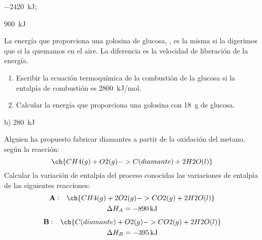 \documentclass[10pt,a5paper,twoside]{article}
\begin{document}
  \begin{solution}
    \begin{enumerate*}
      \item \SI{-2420}{\kilo\joule}; \item \SI{900}{\kilo\joule}
    \end{enumerate*}
  \end{solution}









  \begin{exercise}[
      tags    = {termodinámica, entalpía, entalpia de reacción, calor},
      topics  = {química, termoquímica, termodinámica},
      source  = {},
    ]
    La energía que proporciona una golosina de glucosa, , es la misma si la digerimos que si la quemamos en el aire. La diferencia es la velocidad de liberación de la energía.
    \begin{enumerate}
      \item Escribir la ecuación termoquímica de la combustión de la glucosa si la entalpía de combustión es \SI{2800}{kJ/mol}.
      \item Calcular la energía que proporciona una golosina con \SI{18}{\gram} de glucosa.
    \end{enumerate}
  \end{exercise}

  \begin{solution}
    b) \SI{280}{\kilo\joule}
  \end{solution}




  \begin{exercise}[
      tags    = {termodinámica, entalpía, ley de Hess},
      topics  = {química, termoquímica, termodinámica},
      source  = {},
    ]
    Alguien ha propuesto fabricar diamantes a partir de la oxidación del metano, según la reacción:
    \[ \ch{CH4(g) + O2(g) -> C(diamante) + 2 H2O(l)}  \]
    Calcular la variación de entalpía del proceso conocidas las variaciones de entalpía de las siguientes reacciones:
    \begin{multline*}
      \mathbf{A:}\quad\ch{CH4(g) + 2 O2(g) -> CO2(g) + 2 H2O(l)} \\
        \Delta H_A = \SI{-890}{\kilo\joule}
    \end{multline*}
    \begin{multline*}
      \mathbf{B:}\quad\ch{C(diamante) + O2(g) -> CO2(g) + 2 H2O(l)} \\
        \Delta H_B = \SI{-395}{\kilo\joule}
    \end{multline*}


  \end{exercise}
\end{document}
